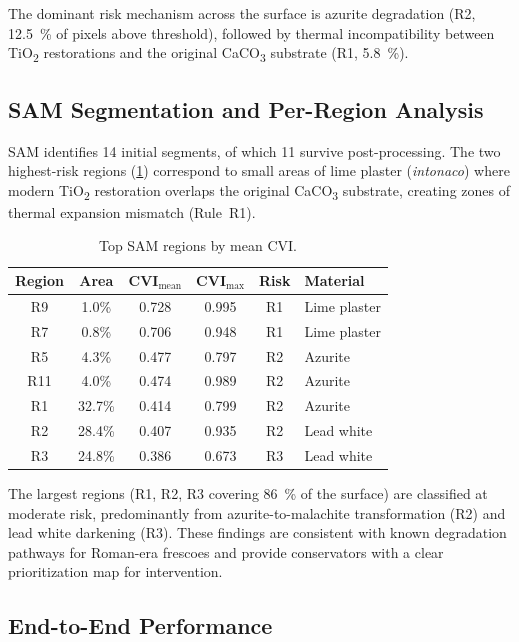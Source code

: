 \documentclass[twocolumn,11pt]{article}
\begin{document}
The dominant risk mechanism across the surface is azurite degradation (R2,
\SI{12.5}{\percent} of pixels above threshold), followed by thermal
incompatibility between TiO\textsubscript{2} restorations and the original
CaCO\textsubscript{3} substrate (R1, \SI{5.8}{\percent}).

\subsection{SAM Segmentation and Per-Region Analysis}

SAM identifies 14 initial segments, of which 11 survive post-processing.
The two highest-risk regions (\cref{tab:sam_regions}) correspond to small
areas of lime plaster (\emph{intonaco}) where modern TiO\textsubscript{2}
restoration overlaps the original CaCO\textsubscript{3} substrate, creating
zones of thermal expansion mismatch (Rule~R1).

\begin{table}[h]
\centering
\caption{Top SAM regions by mean CVI.}
\label{tab:sam_regions}
\small
\begin{tabular}{@{}cccccl@{}}
\toprule
Region & Area & CVI$_{\text{mean}}$ & CVI$_{\text{max}}$ & Risk & Material \\
\midrule
R9  & 1.0\% & 0.728 & 0.995 & R1 & Lime plaster \\
R7  & 0.8\% & 0.706 & 0.948 & R1 & Lime plaster \\
R5  & 4.3\% & 0.477 & 0.797 & R2 & Azurite \\
R11 & 4.0\% & 0.474 & 0.989 & R2 & Azurite \\
R1  & 32.7\% & 0.414 & 0.799 & R2 & Azurite \\
R2  & 28.4\% & 0.407 & 0.935 & R2 & Lead white \\
R3  & 24.8\% & 0.386 & 0.673 & R3 & Lead white \\
\bottomrule
\end{tabular}
\end{table}

The largest regions (R1, R2, R3 covering \SI{86}{\percent} of the surface)
are classified at moderate risk, predominantly from azurite-to-malachite
transformation (R2) and lead white darkening (R3). These findings are
consistent with known degradation pathways for Roman-era frescoes and
provide conservators with a clear prioritization map for intervention.

\subsection{End-to-End Performance}
\end{document}
